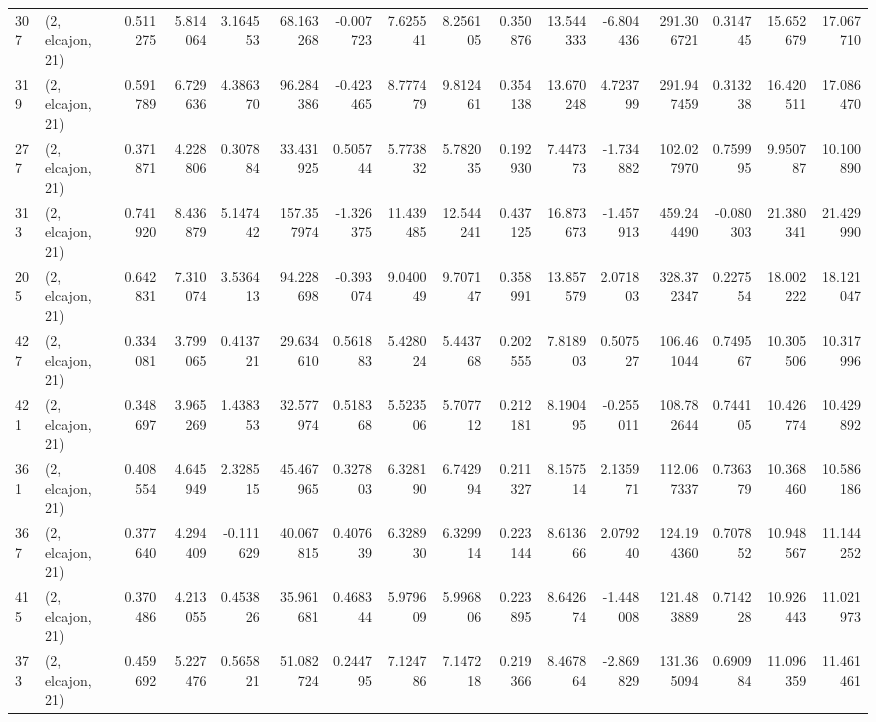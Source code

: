 \begin{tabular}{llrrrrrrrrrrrrrr}
307 &  (2, elcajon, 21) &   0.511275 &   5.814064 &   3.164553 &    68.163268 &  -0.007723 &   7.625541 &   8.256105 &  0.350876 &  13.544333 &  -6.804436 &   291.306721 &   0.314745 &  15.652679 &  17.067710 \\
319 &  (2, elcajon, 21) &   0.591789 &   6.729636 &   4.386370 &    96.284386 &  -0.423465 &   8.777479 &   9.812461 &  0.354138 &  13.670248 &   4.723799 &   291.947459 &   0.313238 &  16.420511 &  17.086470 \\
277 &  (2, elcajon, 21) &   0.371871 &   4.228806 &   0.307884 &    33.431925 &   0.505744 &   5.773832 &   5.782035 &  0.192930 &   7.447373 &  -1.734882 &   102.027970 &   0.759995 &   9.950787 &  10.100890 \\
313 &  (2, elcajon, 21) &   0.741920 &   8.436879 &   5.147442 &   157.357974 &  -1.326375 &  11.439485 &  12.544241 &  0.437125 &  16.873673 &  -1.457913 &   459.244490 &  -0.080303 &  21.380341 &  21.429990 \\
205 &  (2, elcajon, 21) &   0.642831 &   7.310074 &   3.536413 &    94.228698 &  -0.393074 &   9.040049 &   9.707147 &  0.358991 &  13.857579 &   2.071803 &   328.372347 &   0.227554 &  18.002222 &  18.121047 \\
427 &  (2, elcajon, 21) &   0.334081 &   3.799065 &   0.413721 &    29.634610 &   0.561883 &   5.428024 &   5.443768 &  0.202555 &   7.818903 &   0.507527 &   106.461044 &   0.749567 &  10.305506 &  10.317996 \\
421 &  (2, elcajon, 21) &   0.348697 &   3.965269 &   1.438353 &    32.577974 &   0.518368 &   5.523506 &   5.707712 &  0.212181 &   8.190495 &  -0.255011 &   108.782644 &   0.744105 &  10.426774 &  10.429892 \\
361 &  (2, elcajon, 21) &   0.408554 &   4.645949 &   2.328515 &    45.467965 &   0.327803 &   6.328190 &   6.742994 &  0.211327 &   8.157514 &   2.135971 &   112.067337 &   0.736379 &  10.368460 &  10.586186 \\
367 &  (2, elcajon, 21) &   0.377640 &   4.294409 &  -0.111629 &    40.067815 &   0.407639 &   6.328930 &   6.329914 &  0.223144 &   8.613666 &   2.079240 &   124.194360 &   0.707852 &  10.948567 &  11.144252 \\
415 &  (2, elcajon, 21) &   0.370486 &   4.213055 &   0.453826 &    35.961681 &   0.468344 &   5.979609 &   5.996806 &  0.223895 &   8.642674 &  -1.448008 &   121.483889 &   0.714228 &  10.926443 &  11.021973 \\
373 &  (2, elcajon, 21) &   0.459692 &   5.227476 &   0.565821 &    51.082724 &   0.244795 &   7.124786 &   7.147218 &  0.219366 &   8.467864 &  -2.869829 &   131.365094 &   0.690984 &  11.096359 &  11.461461 \\

\end{tabular}
